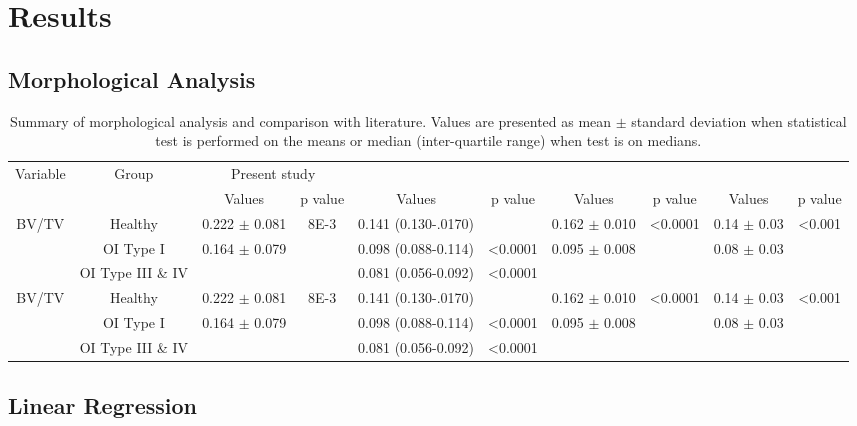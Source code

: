 \documentclass[a4paper,fleqn]{DC_ArtStyle}
\begin{document}
\section{Results}

\subsection{Morphological Analysis}

\begin{sidewaystable}
	\centering
	\caption{Summary of morphological analysis and comparison with literature. Values are presented as mean $\pm$ standard deviation when statistical test is performed on the means or median (inter-quartile range) when test is on medians.}
	\begin{tabular}{cccccccccc}
		\toprule
		\multirow{2}{*}{Variable} & \multirow{2}{*}{Group} & \multicolumn{2}{c}{Present study} & \multicolumn{2}{c}{\citeauthor{Folkestad2012}\cite{Folkestad2012}} & \multicolumn{2}{c}{\citeauthor{Kocijan2015}\cite{Kocijan2015}} & \multicolumn{2}{c}{\citeauthor{Rolvien2018}\cite{Rolvien2018}} \\
		&  & Values & p value & Values & p value & Values & p value & Values & p value \\
		\midrule
		
		\multirow{3}{*}{BV/TV} & Healthy & 0.222 $\pm$ 0.081 & 8E-3 & 0.141 (0.130-.0170) & & 0.162 $\pm$ 0.010 & <0.0001 & 0.14 $\pm$ 0.03 & <0.001 \\
		& OI Type I & \multirow{2}{*}{0.164 $\pm$ 0.079} &  & 0.098 (0.088-0.114) & <0.0001 & \multirow{2}{*}{0.095 $\pm$ 0.008} & & 0.08 $\pm$ 0.03 & \\
		&  OI Type III \& IV & &  & 0.081 (0.056-0.092) & <0.0001 & & & & \\[3ex]
		
		\multirow{3}{*}{BV/TV} & Healthy & 0.222 $\pm$ 0.081 & 8E-3 & 0.141 (0.130-.0170) & & 0.162 $\pm$ 0.010 & <0.0001 & 0.14 $\pm$ 0.03 & <0.001 \\
		& OI Type I & \multirow{2}{*}{0.164 $\pm$ 0.079} &  & 0.098 (0.088-0.114) & <0.0001 & \multirow{2}{*}{0.095 $\pm$ 0.008} & & 0.08 $\pm$ 0.03 & \\
		&  OI Type III \& IV & &  & 0.081 (0.056-0.092) & <0.0001 & & & & \\
		
		\bottomrule
	\end{tabular}
\end{sidewaystable}

\subsection{Linear Regression}
\end{document}
